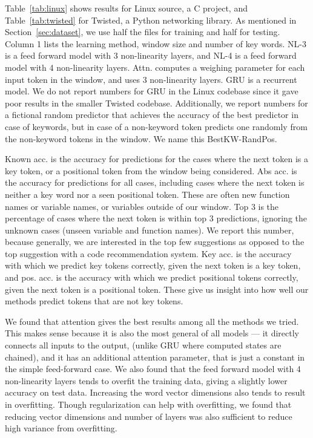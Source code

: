 \noindent
Table~\ref{tab:linux} shows results for Linux source, a C project, and
Table~\ref{tab:twisted} for Twisted, a Python networking library. As mentioned
in Section~\ref{sec:dataset}, we use half the files for training and half for
testing.
Column 1
lists the learning method, window size and number of key words.
NL-3 is a feed forward model with 3 non-linearity layers, and NL-4 is a feed
forward model with 4 non-linearity layers. Attn. computes a weighing
parameter for each input token in the window, and uses 3 non-linearity layers.
GRU is a recurrent model. We do not report numbers for GRU in the Linux codebase
since it gave poor results in the smaller Twisted codebase.
Additionally, we report numbers for a fictional random
predictor that achieves the accuracy of the best predictor in case of keywords,
but in case of a non-keyword token predicts one randomly from the non-keyword
tokens in the window. We name this BestKW-RandPos.

Known acc. is the
accuracy for predictions for the cases where the next token is a key token, or
a positional token from the window being considered. Abs acc. is the accuracy
for predictions for all cases, including cases where the next token is
neither a key word nor a seen positional token. These are often new function
names or variable names, or variables outside of our window. Top 3 is the
percentage of cases where the next token is within top 3 predictions, ignoring
the unknown cases (unseen variable and function names).
We report this number, because generally, we are interested in the top few
suggestions as opposed to the top suggestion with a code recommendation system.
Key acc. is the
accuracy with which we predict key tokens correctly, given the next token is a
key token,
and pos. acc. is the accuracy with which we predict positional tokens
correctly, given the next token is a positional token.
These give us insight into how well our methods predict tokens that are not key
tokens.

We found that attention gives the best results among all the methods we tried.
This makes sense because it is also the most general of all models --- it
directly connects all inputs to the output, (unlike GRU where computed states
are chained), and it has an additional attention parameter, that is just a
constant in the simple feed-forward case. We also found that the feed forward
model with 4 non-linearity layers tends to overfit the training data, giving a slightly
lower accuracy on test data. Increasing the word vector dimensions also tends
to result in overfitting. Though regularization can help with overfitting, we
found that reducing vector dimensions and number of layers was also sufficient
to reduce high variance from overfitting.

